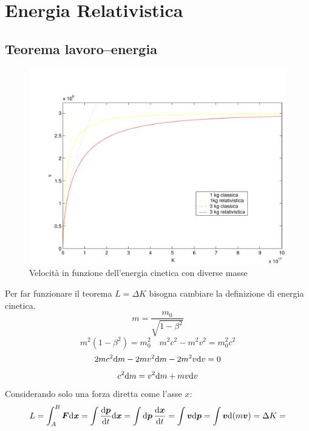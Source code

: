 \section{Energia Relativistica}
\label{energia_cinetica_relativistica}
\subsection{Teorema lavoro--energia}
\begin{figure}[htbp]
   \centering
   \includegraphics[scale=0.6]{immagini/fisica1/V_K}
   \caption{Velocità in funzione dell'energia cinetica con diverse masse}
\end{figure}
Per far funzionare il teorema $L=\Delta K$ bisogna cambiare la definizione di energia cinetica.
\begin{equation*}m=\frac{m_0}{\sqrt{1-\beta^2}}\end{equation*}
\begin{equation*}m^2(1-\beta^2)=m_0^2\quad m^2c^2-m^2v^2=m_0^2c^2\end{equation*}
\begin{equation*}2mc^2\mathrm{d} m-2mv^2\mathrm{d} m-2m^2v\mathrm{d} v=0\end{equation*}
\begin{equation*}c^2\mathrm{d} m=v^2\mathrm{d} m+mv\mathrm{d} v\end{equation*}
Considerando solo una forza diretta come l'asse $x$:
\begin{equation*}L=\int_A^B \boldsymbol{F}\mathrm{d} \boldsymbol{x}=\int\frac{\mathrm{d} \boldsymbol{p}}{\mathrm{d} t}\mathrm{d} \boldsymbol{x}=\int\mathrm{d} \boldsymbol{p}\,\frac{\mathrm{d}\boldsymbol{x}}{\mathrm{d} t}=\int \boldsymbol{v}\mathrm{d} \boldsymbol{p}=\int \boldsymbol{v}\mathrm{d}(m\boldsymbol{v})=\Delta K=\end{equation*}
